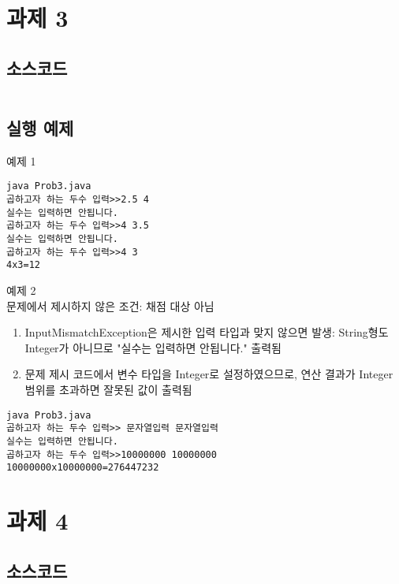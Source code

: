 \documentclass{article}
\theoremstyle{nonumberplain}
\begin{document}
\section{과제 3}
\subsection{소스코드}
\begin{code}
\inputminted{java}{java/Prob3.java}
\end{code}

\subsection{실행 예제}
예제 1
\begin{code}
\begin{verbatim}
java Prob3.java
곱하고자 하는 두수 입력>>2.5 4
실수는 입력하면 안됩니다.
곱하고자 하는 두수 입력>>4 3.5
실수는 입력하면 안됩니다.
곱하고자 하는 두수 입력>>4 3
4x3=12
\end{verbatim}
\end{code}
예제 2 \\
문제에서 제시하지 않은 조건: 채점 대상 아님
\begin{enumerate}
  \item InputMismatchException은 제시한 입력 타입과 맞지 않으면 발생: String형도 Integer가 아니므로 "실수는 입력하면 안됩니다." 출력됨
  \item 문제 제시 코드에서 변수 타입을 Integer로 설정하였으므로, 연산 결과가 Integer 범위를 초과하면 잘못된 값이 출력됨
\end{enumerate}
\begin{code}
\begin{verbatim}
java Prob3.java
곱하고자 하는 두수 입력>> 문자열입력 문자열입력
실수는 입력하면 안됩니다.
곱하고자 하는 두수 입력>>10000000 10000000
10000000x10000000=276447232
\end{verbatim}
\end{code}



\section{과제 4}
\subsection{소스코드}
\begin{code}
\inputminted{java}{java/Prob4.java}
\end{code}
\end{document}
